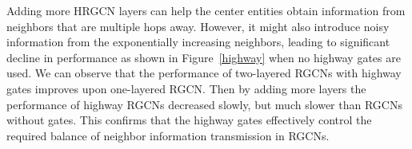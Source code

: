 	Adding more HRGCN layers can help the center entities obtain information from neighbors that are multiple hops away. However, it might also introduce noisy information from the exponentially increasing neighbors, leading to significant decline in performance as shown in Figure~\ref{highway} when no highway gates are used. We can observe that the performance of two-layered RGCNs with highway gates improves upon one-layered RGCN. Then by adding more layers the performance of highway RGCNs decreased slowly, but much slower than RGCNs without gates. This confirms that the highway gates effectively control the required balance of neighbor information transmission in RGCNs.
	
